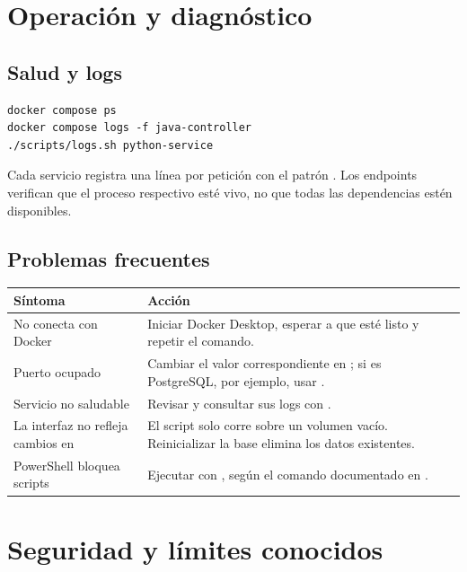 \section{Operación y diagnóstico}

\subsection{Salud y logs}

\begin{lstlisting}
docker compose ps
docker compose logs -f java-controller
./scripts/logs.sh python-service
\end{lstlisting}

Cada servicio registra una línea por petición con el patrón . Los endpoints  verifican que el proceso respectivo esté vivo, no que todas las dependencias estén disponibles.

\subsection{Problemas frecuentes}

\begin{tabularx}{\textwidth}{p{}Y}
\toprule
\textbf{Síntoma} & \textbf{Acción} \\
\midrule
No conecta con Docker & Iniciar Docker Desktop, esperar a que esté listo y repetir el comando. \\
Puerto ocupado & Cambiar el valor correspondiente en ; si es PostgreSQL, por ejemplo, usar . \\
Servicio no saludable & Revisar  y consultar sus logs con . \\
La interfaz no refleja cambios en  & El script solo corre sobre un volumen vacío. Reinicializar la base elimina los datos existentes. \\
PowerShell bloquea scripts & Ejecutar con , según el comando documentado en . \\
\bottomrule
\end{tabularx}

\section{Seguridad y límites conocidos}

